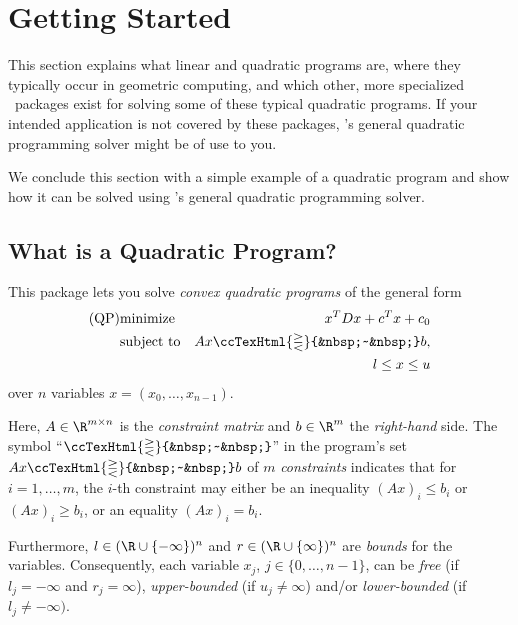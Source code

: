 \newcommand{\qprel}{\ccTexHtml{\gtreqless}{&nbsp;~&nbsp;}}

\label{QPsolver}

\section{Getting Started}
This section explains what linear and quadratic programs are, where
they typically occur in geometric computing, and which other, more
specialized \cgal\ packages exist for solving some of these typical
quadratic programs. If your intended application is not covered
by these packages, \cgal's general quadratic programming solver might
be of use to you.

We conclude this section with a simple example of a quadratic program
and show how it can be solved using \cgal's general quadratic
programming solver.

\subsection{What is a Quadratic Program?}
This package lets you solve \emph{convex quadratic programs} of the 
general form
\begin{eqnarray*}
\mbox{(QP)}&\mbox{minimize} & x^{T}Dx + c^{T}x + c_0 \\
&\mbox{subject to}   & Ax\qprel b, \\
&& l \leq x \leq u
\end{eqnarray*}
over $n$ variables $x=(x_0,\ldots,x_{n-1})$.

Here, $A \in \R^{m \times n}$ is the \emph{constraint matrix} and $b
\in \R^{m}$ the \emph{right-hand} side. The symbol ``$\qprel$'' in the
program's set $Ax \qprel b$ of $m$ \emph{constraints} indicates that for
$i=1,\ldots,m$, the $i$-th constraint may either be an inequality
$(Ax)_i \leq b_i$ or $(Ax)_i \geq b_i$, or an equality $(Ax)_i = b_i$.

Furthermore, $l\in
(\R\cup\{-\infty\})^n$ and $r\in (\R\cup\{\infty\})^n$ are \emph{bounds}
for the variables. Consequently, each
variable $x_j$, $j\in\{0,\ldots,n-1\}$, can be \emph{free} (if
$l_j=-\infty$ and $r_j=\infty$), \emph{upper-bounded} (if
$u_j\neq\infty$) and/or \emph{lower-bounded} (if
$l_j\neq-\infty)$.  


